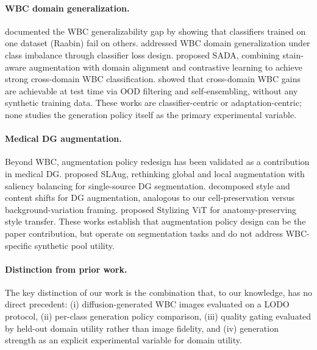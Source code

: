 \documentclass[10pt,twocolumn]{article}
\begin{document}
\paragraph{WBC domain generalization.}
\citet{Tavakoli_2021} documented the WBC generalizability gap by showing
that classifiers trained on one dataset (Raabin) fail on others.
\citet{umer2023imbalanceddomaingeneralizationrobust} addressed WBC domain
generalization under class imbalance through classifier loss design.
\citet{li2024stainawaredomainalignmentimbalance} proposed SADA, combining
stain-aware augmentation with domain alignment and contrastive learning
to achieve strong cross-domain WBC classification. \citet{Putzu_2025}
showed that cross-domain WBC gains are achievable at test time via OOD
filtering and self-ensembling, without any synthetic training data. These
works are classifier-centric or adaptation-centric; none studies the
generation policy itself as the primary experimental variable.

\paragraph{Medical DG augmentation.}
Beyond WBC, augmentation policy redesign has been validated as a
contribution in medical DG.
\citet{su2022rethinkingdataaugmentationsinglesource} proposed SLAug,
rethinking global and local augmentation with saliency balancing for
single-source DG segmentation.
\citet{shen2025stylecontentdecompositionbaseddata} decomposed style and
content shifts for DG augmentation, analogous to our cell-preservation
versus background-variation framing.
\citet{doerrich2026stylizingvitanatomypreservinginstance} proposed
Stylizing ViT for anatomy-preserving style transfer. These works
establish that augmentation policy design can be the paper contribution,
but operate on segmentation tasks and do not address WBC-specific
synthetic pool utility.

\paragraph{Distinction from prior work.}
The key distinction of our work is the combination that, to our
knowledge, has no direct precedent: (i) diffusion-generated WBC images
evaluated on a LODO protocol, (ii) per-class generation policy
comparison, (iii) quality gating evaluated by held-out domain utility
rather than image fidelity, and (iv) generation strength as an explicit
experimental variable for domain utility.
\end{document}
